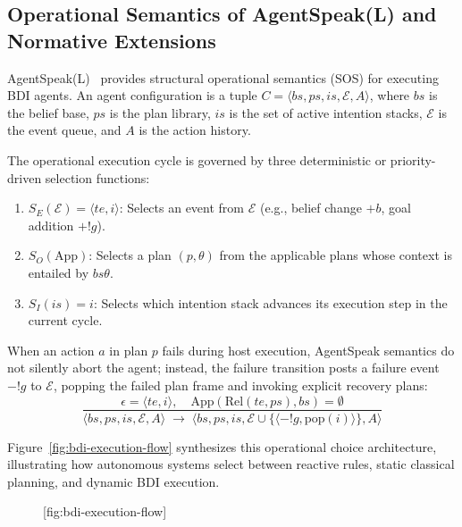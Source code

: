 \subsection{Operational Semantics of AgentSpeak(L) and Normative Extensions}

AgentSpeak(L)~ provides structural operational semantics (SOS) for executing BDI agents. An agent configuration is a tuple $C = \langle bs, ps, is, \mathcal{E}, A \rangle$, where $bs$ is the belief base, $ps$ is the plan library, $is$ is the set of active intention stacks, $\mathcal{E}$ is the event queue, and $A$ is the action history.

The operational execution cycle is governed by three deterministic or priority-driven selection functions:
\begin{enumerate}[leftmargin=1.8em,itemsep=2pt]
  \item $S_E(\mathcal{E}) = \langle te, i \rangle$: Selects an event from $\mathcal{E}$ (e.g., belief change $+b$, goal addition $+!g$).
  \item $S_O(\mathrm{App})$: Selects a plan $(p, \theta)$ from the applicable plans whose context is entailed by $bs\theta$.
  \item $S_I(is) = i$: Selects which intention stack advances its execution step in the current cycle.
\end{enumerate}

When an action $a$ in plan $p$ fails during host execution, AgentSpeak semantics do not silently abort the agent; instead, the failure transition posts a failure event $-!g$ to $\mathcal{E}$, popping the failed plan frame and invoking explicit recovery plans:
\begin{equation}
\frac{\epsilon = \langle te, i \rangle, \quad \mathrm{App}(\mathrm{Rel}(te, ps), bs) = \emptyset}{\langle bs, ps, is, \mathcal{E}, A \rangle \;\longrightarrow\; \langle bs, ps, is, \mathcal{E} \cup \{\langle -!g, \mathrm{pop}(i) \rangle\}, A \rangle}
\end{equation}

Figure~\ref{fig:bdi-execution-flow} synthesizes this operational choice architecture, illustrating how autonomous systems select between reactive rules, static classical planning, and dynamic BDI execution.

\begin{figure}[tp]
  \centering
  [fig:bdi-execution-flow]
\end{figure}

